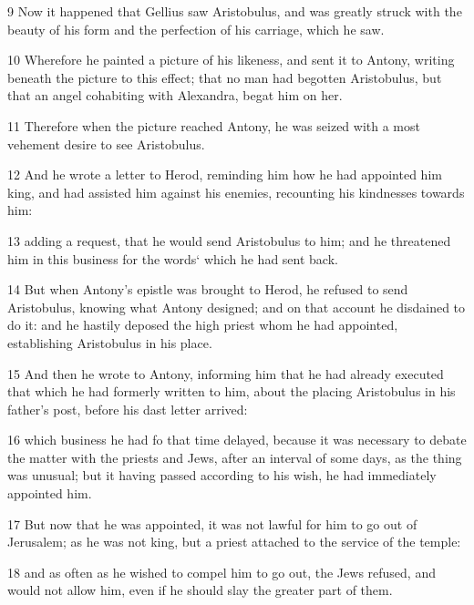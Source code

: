 \par 9 Now it happened that Gellius saw Aristobulus, and was greatly struck with the beauty of his form and the perfection of his carriage, which he saw. 

\par 10 Wherefore he painted a picture of his likeness, and sent it to Antony, writing beneath the picture to this effect; that no man had begotten Aristobulus, but that an angel cohabiting with Alexandra, begat him on her. 

\par 11 Therefore when the picture reached Antony, he was seized with a most vehement desire to see Aristobulus. 

\par 12 And he wrote a letter to Herod, reminding him how he had appointed him king, and had assisted him against his enemies, recounting his kindnesses towards him: 

\par 13 adding a request, that he would send Aristobulus to him; and he threatened him in this business for the words‘ which he had sent back. 

\par 14 But when Antony’s epistle was brought to Herod, he refused to send Aristobulus, knowing what Antony designed; and on that account he disdained to do it: and he hastily deposed the high priest whom he had appointed, establishing Aristobulus in his place. 

\par 15 And then he wrote to Antony, informing him that he had already executed that which he had formerly written to him, about the placing Aristobulus in his father’s post, before his dast letter arrived: 

\par 16 which business he had fo that time delayed, because it was necessary to debate the matter with the priests and Jews, after an interval of some days, as the thing was unusual; but it having passed according to his wish, he had immediately appointed him. 

\par 17 But now that he was appointed, it was not lawful for him to go out of Jerusalem; as he was not king, but a priest attached to the service of the temple: 

\par 18 and as often as he wished to compel him to go out, the Jews refused, and would not allow him, even if he should slay the greater part of them. 

